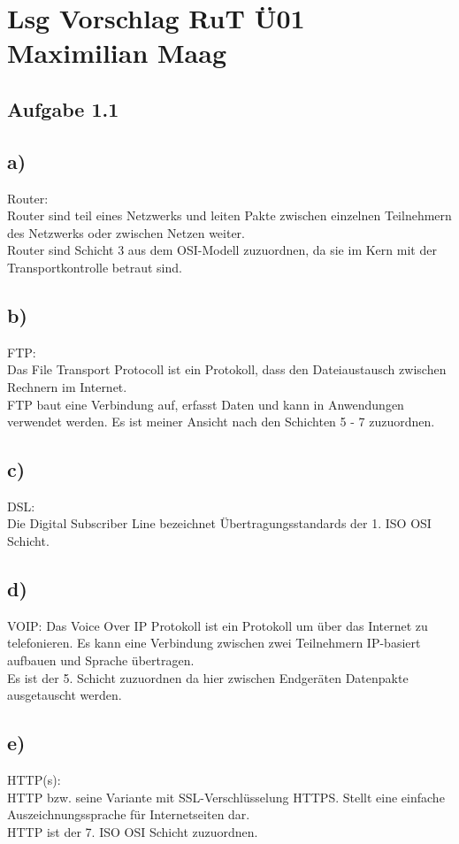 \documentclass{article}
\begin{document}
	\section*{Lsg Vorschlag RuT Ü01 Maximilian Maag}
	\subsection*{Aufgabe 1.1}
	\subsection*{a)}
	Router: \\
	Router sind teil eines Netzwerks und leiten Pakte zwischen einzelnen Teilnehmern des Netzwerks oder zwischen Netzen weiter. \\
	Router sind Schicht 3 aus dem OSI-Modell zuzuordnen, da sie im Kern mit der Transportkontrolle betraut sind.
	\subsection*{b)}
	FTP: \\
	Das File Transport Protocoll ist ein Protokoll, dass den Dateiaustausch zwischen Rechnern im Internet. \\
	FTP baut eine Verbindung auf, erfasst Daten und kann in Anwendungen verwendet werden. Es ist meiner Ansicht nach den Schichten 5 - 7 zuzuordnen.
	\subsection*{c)}
	DSL: \\
	Die Digital Subscriber Line bezeichnet Übertragungsstandards der 1. ISO OSI Schicht.
	\subsection*{d)}
	VOIP:
	Das Voice Over IP Protokoll ist ein Protokoll um über das Internet zu telefonieren. Es kann eine Verbindung zwischen zwei Teilnehmern IP-basiert aufbauen und Sprache übertragen. \\
	Es ist der 5. Schicht zuzuordnen da hier zwischen Endgeräten Datenpakte ausgetauscht werden.
	\subsection*{e)}
	HTTP(s): \\
	HTTP bzw. seine Variante mit SSL-Verschlüsselung HTTPS. Stellt eine einfache Auszeichnungssprache für Internetseiten dar. \\
	HTTP ist der 7. ISO OSI Schicht zuzuordnen.
\end{document}
